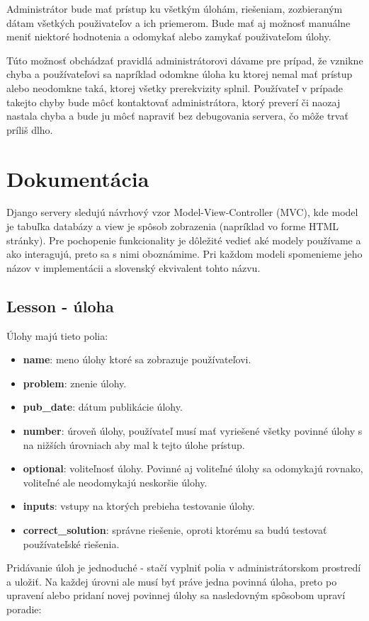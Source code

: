 Administrátor bude mať prístup ku všetkým úlohám, riešeniam, zozbieraným dátam všetkých použivateľov a ich priemerom. Bude mať aj možnosť manuálne meniť niektoré hodnotenia a odomykať alebo zamykať použivateľom úlohy.

Túto možnosť obchádzať pravidlá administrátorovi dávame pre prípad, že vznikne chyba a používateľovi sa napríklad odomkne úloha ku ktorej nemal mať prístup alebo neodomkne taká, ktorej všetky prerekvizity splnil. Používateľ v prípade takejto chyby bude môcť kontaktovať administrátora, ktorý preverí či naozaj nastala chyba a bude ju môcť napraviť bez debugovania servera, čo môže trvať príliš dlho.

\section{Dokumentácia}
\label{dokumentacia}
Django servery sledujú návrhový vzor Model-View-Controller (MVC), kde model je tabuľka
databázy a view je spôsob zobrazenia (napríklad vo forme HTML stránky). Pre pochopenie
funkcionality je dôležité vedieť aké modely používame a ako interagujú, preto sa s nimi
oboznámime. Pri každom modeli spomenieme jeho názov v implementácii a slovenský ekvivalent
tohto názvu.
\subsection{Lesson - úloha}
Úlohy majú tieto polia:
\begin{itemize}
\itemsep0em
\item \textbf{name}: meno úlohy ktoré sa zobrazuje používateľovi.
\item \textbf{problem}: znenie úlohy.
\item \textbf{pub\_date}: dátum publikácie úlohy.
\item \textbf{number}: úroveň úlohy, používateľ musí mať vyriešené všetky povinné úlohy s
  na nižších úrovniach aby mal k tejto úlohe prístup.
\item \textbf{optional}: voliteľnosť úlohy. Povinné aj voliteľné úlohy sa odomykajú rovnako, voliteľné
   ale neodomykajú neskoršie úlohy.
\item \textbf{inputs}: vstupy na ktorých prebieha testovanie úlohy.
\item \textbf{correct\_solution}: správne riešenie, oproti ktorému sa budú testovať používateľské
   riešenia.
\end{itemize}

Pridávanie úloh je jednoduché - stačí vyplniť polia v administrátorskom prostredí
a uložiť. Na každej úrovni ale musí byť práve jedna povinná úloha, preto po upravení
alebo pridaní novej povinnej úlohy sa nasledovným spôsobom upraví poradie:

